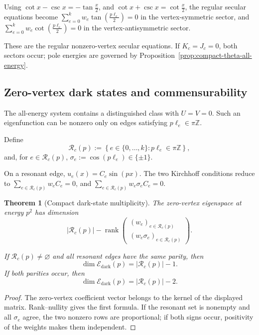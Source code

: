 \documentclass[11pt]{article}
\theoremstyle{plain}
\newtheorem{theorem}{Theorem}[section]
\theoremstyle{definition}
\begin{document}
Using
\(\cot x-\csc x = -\tan\frac{x}{2}\),
and
\(\cot x+\csc x = \cot\frac{x}{2}\),
the regular secular equations become \(\sum_{e=0}^{k} w_e \tan \left( \frac{p\ell_e}{2} \right) = 0\) in the vertex-symmetric sector, and \(\sum_{e=0}^{k} w_e \cot \left( \frac{p\ell_e}{2} \right) = 0\) in the vertex-antisymmetric sector.

These are the regular nonzero-vertex secular equations. If \(K_c=J_c=0\), both sectors occur; pole energies are governed by Proposition~\ref{prop:compact-theta-all-energy}.

\subsection{Zero-vertex dark states and commensurability}
\label{subsec:compact-theta-dark}
\label{subsec:compact-theta-perturbation}

The all-energy system contains a distinguished class with
\(U=V=0\).
Such an eigenfunction can be nonzero only on edges satisfying
\(p\ell_e\in\pi\mathbb Z\).

Define
\[
  \mathcal R_c(p)
  :=
  \left\{
    e\in\{0,\ldots,k\}:
    p\ell_e\in\pi\mathbb Z
  \right\},
\]
and, for \(e\in\mathcal R_c(p)\),
\(\sigma_e := \cos(p\ell_e) \in\{\pm1\}\).

On a resonant edge,
\(u_e(x)=C_e\sin(px)\).
The two Kirchhoff conditions reduce to
\(\sum_{e\in\mathcal R_c(p)} w_eC_e=0\),
and
\(\sum_{e\in\mathcal R_c(p)} w_e\sigma_eC_e=0\).

\begin{theorem}[Compact dark-state multiplicity]
\label{thm:compact-theta-dark}
The zero-vertex eigenspace at energy \(p^2\) has dimension
\[
  |\mathcal R_c(p)|
  -
  \operatorname{rank}
  \begin{pmatrix}
    (w_e)_{e\in\mathcal R_c(p)}
    \\[1mm]
    (w_e\sigma_e)_{e\in\mathcal R_c(p)}
  \end{pmatrix}.
\]

If \(\mathcal R_c(p)\neq\varnothing\) and all resonant edges have the same
parity, then
\[
  \dim\mathcal E_{\mathrm{dark}}(p)
  =
  |\mathcal R_c(p)|-1.
\]
If both parities occur, then
\[
  \dim\mathcal E_{\mathrm{dark}}(p)
  =
  |\mathcal R_c(p)|-2.
\]
\end{theorem}

\begin{proof}
The zero-vertex coefficient vector belongs to the kernel of the displayed
matrix. Rank--nullity gives the first formula. If the resonant set is
nonempty and all \(\sigma_e\) agree, the two nonzero rows are proportional;
if both signs occur, positivity of the weights makes them independent.
\end{proof}
\end{document}
